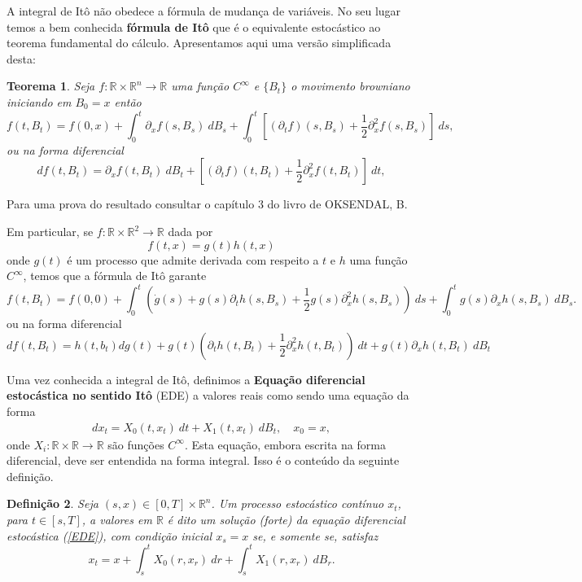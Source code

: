 \documentclass[12pt]{article}
\newtheorem{teo}{Teorema}%
\newtheorem{defn}[teo]{Definição}
\newcommand{\mr }{ \mathbb{R}}
\begin{document}
A integral de Itô não obedece a fórmula de mudança de variáveis. No seu lugar temos a bem conhecida \textbf{fórmula de Itô} que é o equivalente estocástico ao teorema fundamental do cálculo. Apresentamos aqui uma versão simplificada desta: 

\begin{teo}
Seja $f:\mr\times \mr^n\rightarrow \mr$ uma função $C^\infty$ e $\{B_t\}$ o movimento browniano iniciando em $B_0=x$ então 
\[
f(t,B_t)=f(0,x)+\int_0^t\partial_xf(s,B_s)~dB_s+\int_0^t\left[(\partial_tf)(s,B_s)+\frac{1}{2}\partial_x^2f(s,B_s)\right]~ds,\] ou na forma diferencial 
\[
df(t,B_t)= \partial_xf(t,B_t)~dB_t+ \left[(\partial_tf)(t,B_t)+\frac{1}{2}\partial_x^2f(t,B_t)\right]~dt,\]

\end{teo}
Para uma prova do resultado consultar o capítulo 3 do livro de OKSENDAL, B.
\begin{exemplo}
Em particular, se $f:\mr\times \mr^2\rightarrow \mr$ dada por 
\[
f(t,x)=g(t)h(t,x)
\]
onde $g(t)$ é um processo que admite derivada com respeito a $t$ e $h$ uma função $C^\infty$, temos que a fórmula de Itô garante
\[
f(t,B_t)=f(0,0)+\int_0^t\left(\dot{g}(s)+g(s)\partial_th(s,B_s)+\frac{1}{2}g(s)\partial_x^2h(s,B_s)\right)~ds+\int_0^tg(s)\partial_xh(s,B_s)~dB_s.
\]
ou na forma diferencial 
\[
df(t,B_t)=h(t,b_t)dg(t)+g(t)\left(\partial_th(t,B_t)+\frac{1}{2}\partial_x^2h(t,B_t)\right)~dt+g(t)\partial_xh(t,B_t)~dB_t
\]
\end{exemplo}

Uma vez conhecida a integral de Itô, definimos a \textbf{Equa\c{c}\~ao diferencial estoc\'astica no sentido It\^o} (EDE) a valores reais como sendo uma equação da forma 
\begin{eqnarray}\label{EDE}
 dx_t=X_0(t,x_t)~dt+ X_1 (t,x_t)~dB_t, \quad x_0=x,
\end{eqnarray}
onde $X_i:\mr\times \mr\rightarrow \mr$ são funções $C^\infty$.
Esta equação, embora escrita na forma diferencial, deve ser entendida na forma integral. Isso é o conteúdo da seguinte definição.
\begin{defn}
Seja $(s,x)\in[0,T]\times\mr^n$. Um processo estoc\'astico cont\'inuo $x_t$, para $t\in[s,T]$, a valores em $\mr $ \'e dito um solu\c{c}\~ao (forte) da equação diferencial estocástica (\ref{EDE}), com condi\c{c}\~ao inicial $x_s=x$ se, e somente se, satisfaz
\[
 x_t=x+\int_s^tX_0(r,x_r)~dr+ \int_s^tX_1(r,x_r)~dB_r .
\] 
\end{defn}
\end{document}
